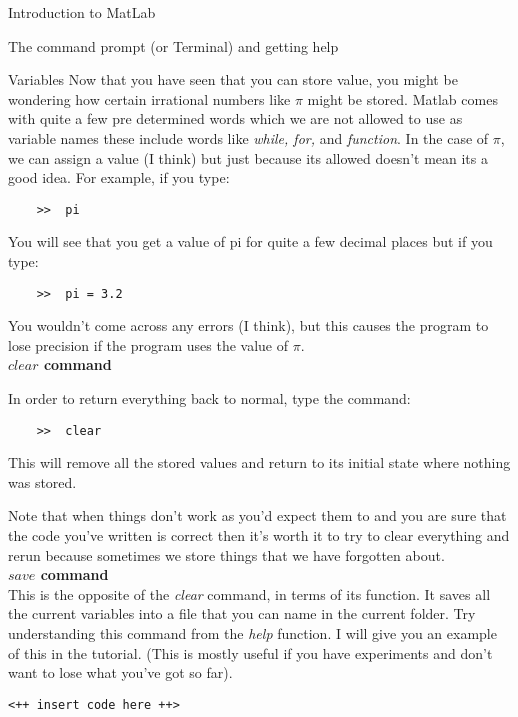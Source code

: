 \documentclass[11pt, oneside]{report}   	%
\begin{document}
\begin{chapter}{Introduction to MatLab}
\begin{section}{The command prompt (or Terminal) and getting help}
\begin{subsection}{Variables}
Now that you have seen that you can store value, you might be wondering how certain irrational numbers like $\pi$
might be stored. Matlab comes with quite a few pre determined words which we are not allowed to use as variable
names these include words like \textit{while, for,} and \textit{function}. In the case of $\pi$, we can assign a value (I 
think) but just because its allowed doesn't mean its a good idea. For example, if you type:

\begin{lstlisting}
	>>	pi
\end{lstlisting}

You will see that you get a value of pi for quite a few decimal places but if you type:

\begin{lstlisting}
	>>	pi = 3.2
\end{lstlisting}
You wouldn't come across any errors (I think), but this causes the program to lose precision if the program uses the
value of $\pi$. 
\\

\textbf{$clear$ command}

In order to return everything back to normal, type the command:

\begin{lstlisting}
	>>	clear
\end{lstlisting}

This will remove all the stored values and return to its initial state where nothing was stored. 

Note that when things don't work as you'd expect them to and you are sure that the code you've written is correct
then it's worth it to try to clear everything and rerun because
sometimes we store things that we have forgotten about.
\\

\textbf{$save$ command}
\\


This is the opposite of the \textit{clear} command, in terms of its function. It saves all the current variables into a file
that you can name in the current folder. Try understanding
this command from the \textit{help} function. I will give you an example of this in the tutorial. (This is mostly useful if
you have experiments and don't want to lose what you've
got so far).

\begin{lstlisting}
<++ insert code here ++>
\end{lstlisting}


\end{subsection}
\end{section}
\end{chapter}
\end{document}
